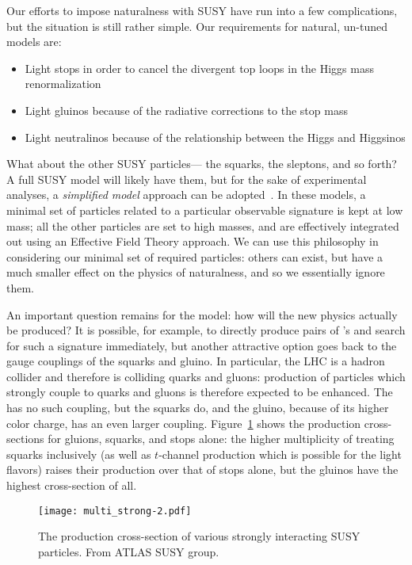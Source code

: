 Our efforts to impose naturalness with SUSY have run into a few complications, but the situation is still rather simple. Our requirements for natural, un-tuned models are:
%
\begin{itemize}
\item Light stops in order to cancel the divergent top loops in the Higgs mass renormalization
\item Light gluinos because of the radiative corrections to the stop mass
\item Light neutralinos because of the relationship between the Higgs and Higgsinos
\end{itemize}
%
What about the other SUSY particles--- the squarks, the sleptons, and so forth? A full SUSY model will likely have them, but for the sake of experimental analyses, a \textit{simplified model} approach can be adopted~\cite{simplified}. In these models, a minimal set of particles related to a particular observable signature is kept at low mass; all the other particles are set to high masses, and are effectively integrated out using an Effective Field Theory approach. We can use this philosophy in considering our minimal set of required particles: others can exist, but have a much smaller effect on the physics of naturalness, and so we essentially ignore them.


An important question remains for the model: how will the new physics actually be produced? It is possible, for example, to directly produce pairs of \lsp's and search for such a signature immediately, but another attractive option goes back to the gauge couplings of the squarks and gluino. In particular, the LHC is a hadron collider and therefore is colliding quarks and gluons: production of particles which strongly couple to quarks and gluons is therefore expected to be enhanced. The \lsp has no such coupling, but the squarks do, and the gluino, because of its higher color charge, has an even larger coupling. Figure~\ref{fig:susy:multi_strong} shows the production cross-sections for gluions, squarks, and stops alone: the higher multiplicity of treating squarks inclusively (as well as $t$-channel production which is possible for the light flavors) raises their production over that of stops alone, but the gluinos have the highest cross-section of all. 


\begin{figure}
\centering
\texttt{[image: multi\_strong-2.pdf]}
\label{fig:susy:multi_strong}
\caption{The production cross-section of various strongly interacting SUSY particles. From ATLAS SUSY group.}
\end{figure}

